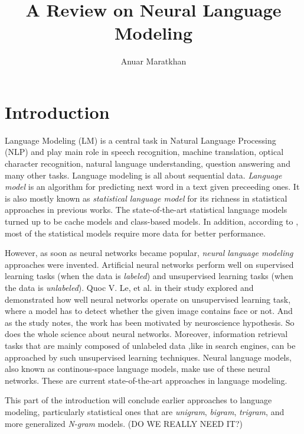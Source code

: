 \documentclass{IEEEtran}
\begin{document}
\title{A Review on Neural Language Modeling}

\author{Anuar Maratkhan}

\maketitle

\section{Introduction}

Language Modeling (LM) is a central task in Natural Language Processing (NLP) and play main role in speech recognition, machine translation, optical character recognition, natural language understanding, question answering and many other tasks. Language modeling is all about sequential data. \textit{Language model} is an algorithm for predicting next word in a text given preceeding ones. It is also mostly known as \textit{statistical language model} for its richness in statistical approaches in previous works. The state-of-the-art statistical language models turned up to be cache models and class-based models. In addition, according to \cite{Mikolov2010NeuralLM}, most of the statistical models require more data for better performance. 

However, as soon as neural networks became popular, \textit{neural language modeling} approaches were invented. Artificial neural networks perform well on supervised learning tasks (when the data is \textit{labeled}) and unsupervised learning tasks (when the data is \textit{unlabeled}). Quoc V. Le, et al. in their study \cite{unsupervised} explored and demonstrated how well neural networks operate on unsupervised learning task, where a model has to detect whether the given image contains face or not. And as the study \cite{unsupervised} notes, the work has been motivated by neuroscience hypothesis. So does the whole science about neural networks. Moreover, information retrieval tasks that are mainly composed of unlabeled data ,like in search engines, can be approached by such unsupervised learning techniques. Neural language models, also known as continous-space language models, make use of these neural networks. These are current state-of-the-art approaches in language modeling.

This part of the introduction will conclude earlier approaches to language modeling, particularly statistical ones that are \textit{unigram}, \textit{bigram}, \textit{trigram}, and more generalized \textit{N-gram} models. (DO WE REALLY NEED IT?)
\end{document}
